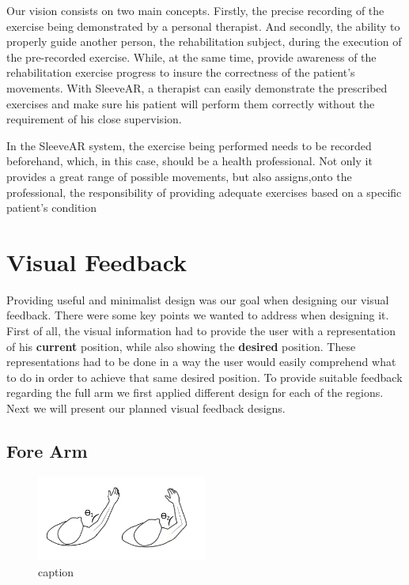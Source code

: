 Our vision consists on two main concepts. Firstly, the precise recording of the exercise being demonstrated by a personal therapist. 
And secondly, the ability to properly guide another person, the rehabilitation subject, during the execution of the pre-recorded exercise. 
While, at the same time, provide awareness of the rehabilitation exercise progress to insure the correctness of the patient's movements.
With SleeveAR, a therapist can easily demonstrate the prescribed exercises and make sure his patient will perform them correctly without the requirement of his close supervision.

In the SleeveAR system, the exercise being performed needs to be recorded beforehand, which, in this case, should be a health professional. 
Not only it provides a great range of possible movements, but also assigns,onto the professional, the responsibility of providing adequate exercises based on a specific patient's condition


\section{Visual Feedback}

Providing useful and minimalist design was our goal when designing our visual feedback. There were some key points we wanted to address when designing it.
First of all, the visual information had to provide the user with a representation of his \textbf{current} position, while also showing the \textbf{desired} position. 
These representations had to be done in a way the user would easily comprehend what to do in order to achieve that same desired position.
To provide suitable feedback regarding the full arm we first applied different design for each of the regions. Next we will present our planned visual feedback designs.

\subsection{Fore Arm}

\begin{figure}[!t]
    \begin{center}
        \includegraphics[width=0.5\textwidth]{imgs/elbowangle.png}
    \end{center}
    \caption{caption}
    \label{fig:elbowangle}
\end{figure}


